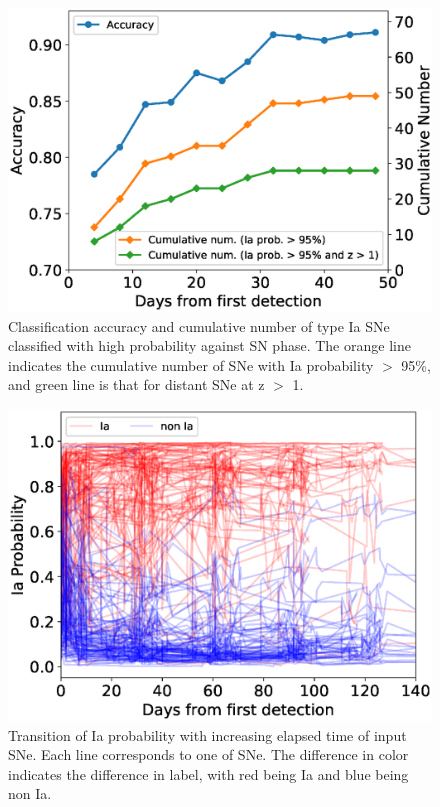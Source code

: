 \documentclass[useamsfonts]{pasj01}
\begin{document}
\begin{figure}[htbp]
  \begin{center}
     \includegraphics[width=\columnwidth]{figures/n_observations_SNphase_v200206.eps}
  \end{center}
  \caption{%
  Classification accuracy and cumulative number of type Ia SNe classified with high probability against SN phase.
  The orange line indicates the cumulative number of SNe with Ia probability $>$ 95\%, and green line is that for distant SNe at z $>$ 1. %
  }%
  \label{fig:n_observations_SNphase}
\end{figure}
%
%
\begin{figure}[htbp]
  \begin{center}
     \includegraphics[width=\columnwidth]{figures/n_observations_visualized_Ia_probability_200206.eps}
  \end{center}
  \caption{%
  Transition of Ia probability with increasing elapsed time of input SNe.
  Each line corresponds to one of SNe.
  The difference in color indicates the difference in label, with red being Ia and blue being non Ia.
  }%
  \label{fig:visualized_Ia_prob}
\end{figure}
\end{document}
